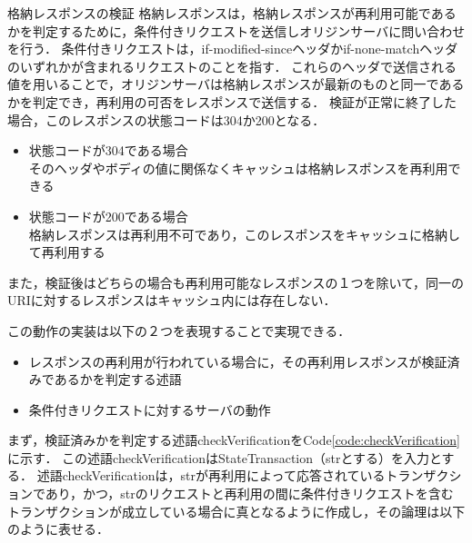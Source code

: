 \documentclass[12pt,a4paper]{jbook}
\begin{document}
\begin{itembox}[l]{格納レスポンスの検証}
格納レスポンスは，格納レスポンスが再利用可能であるかを判定するために，条件付きリクエストを送信しオリジンサーバに問い合わせを行う．
条件付きリクエストは，if-modified-sinceヘッダかif-none-matchヘッダのいずれかが含まれるリクエストのことを指す．
これらのヘッダで送信される値を用いることで，オリジンサーバは格納レスポンスが最新のものと同一であるかを判定でき，再利用の可否をレスポンスで送信する．
検証が正常に終了した場合，このレスポンスの状態コードは304か200となる．
\begin{itemize}
\item 状態コードが304である場合 \\
そのヘッダやボディの値に関係なくキャッシュは格納レスポンスを再利用できる
\item 状態コードが200である場合 \\
格納レスポンスは再利用不可であり，このレスポンスをキャッシュに格納して再利用する
\end{itemize}
また，検証後はどちらの場合も再利用可能なレスポンスの１つを除いて，同一のURIに対するレスポンスはキャッシュ内には存在しない．
\end{itembox}

この動作の実装は以下の２つを表現することで実現できる．
\begin{itemize}
\item レスポンスの再利用が行われている場合に，その再利用レスポンスが検証済みであるかを判定する述語
\item 条件付きリクエストに対するサーバの動作
\end{itemize}

まず，検証済みかを判定する述語checkVerificationをCode\ref{code:checkVerification}に示す．
この述語checkVerificationはStateTransaction（strとする）を入力とする．
述語checkVerificationは，strが再利用によって応答されているトランザクションであり，かつ，strのリクエストと再利用の間に条件付きリクエストを含むトランザクションが成立している場合に真となるように作成し，その論理は以下のように表せる．
\end{document}
